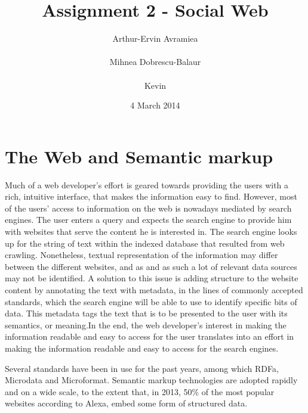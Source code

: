 \documentclass{acm_proc_10ptArticle-sp}
\begin{document}
\title{Assignment 2 - Social Web}

\author{
%
\alignauthor Arthur-Ervin Avramiea\\
       \\
\alignauthor Mihnea Dobrescu-Balaur\\
	\\
\alignauthor Kevin\\
}

\date{4 March 2014}
\maketitle

\section{The Web and Semantic markup}

Much of a web developer's effort is geared towards providing the users with a rich, intuitive interface, that makes the information easy to find. However, most of the users' access to information on the web is nowadays mediated by search engines. The user enters a query and expects the search engine to provide him with websites that serve the content he is interested in. The search engine looks up for the string of text within the indexed database that resulted from web crawling. Nonetheless, textual representation of the information may differ between the different websites, and as and as such a lot of relevant data sources may not be identified. A solution to this issue is adding structure to the website content by annotating the text with metadata, in the lines of commonly accepted standards, which the search engine will be able to use to identify specific bits of data. This metadata tags the text that is to be presented to the user with its semantics, or meaning.In the end, the web developer's interest in making the information readable and easy to access for the user translates into an effort in making the information readable and easy to access for the search engines. 

Several standards have been in use for the past years, among which RDFa, Microdata and Microformat\cite{bizer2013deployment}. Semantic markup technologies are adopted rapidly and on a wide scale, to the extent that, in 2013, 50\% of the most popular websites according to Alexa, embed some form of structured data. 
\end{document}
